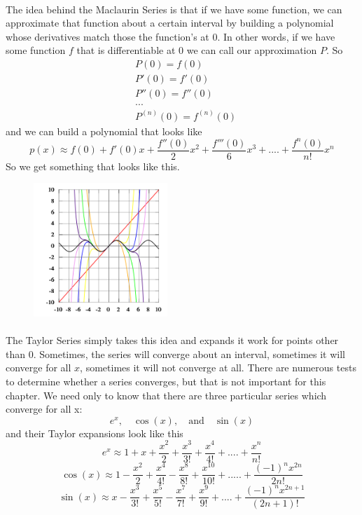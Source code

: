 \documentclass[font =22]{report}
\begin{document}
\paragraph*{}
The idea behind the Maclaurin Series is that if we have some function, we can approximate that function about a certain interval by building a polynomial whose derivatives match those the function's at 0. In other words, if we have some function $f$ that is differentiable at $0$ we can call our approximation $P$. So
\begin{align*}
&P(0) = f(0)\\
&P'(0) = f'(0)\\
&P''(0) = f''(0)\\
&...\\
&P^{(n)}(0) = f^{(n)}(0)
\end{align*}
and we can build a polynomial that looks like
\[
p(x) \approx f(0) + f'(0)x + \frac{f''(0)}{2}x^2 + \frac{f'''(0)}{6}x^3 +....+ \dfrac{f^{n}(0)}{n!}x^n
\]
So we get something that looks like this.
\begin{figure}[H]
\includegraphics[width=0.45\textwidth]{figures/Taylor}
\end{figure}
\paragraph{}
The Taylor Series simply takes this idea and expands it work for points other than $0$.
Sometimes, the series will converge about an interval, sometimes it will converge for all $x$,  sometimes it will not converge at all. There are numerous tests to determine whether a series converges, but that is not important for this chapter. We need only to know that there are three particular series which converge for all x: 
\[
e^x, \quad \cos(x) , \quad  \text{and} \quad \sin(x)
\]
and their Taylor expansions look like this 
\[
e^x \approx 1 + x + \frac{x^2}{2} + \frac{x^3}{3!} +\frac{x^4}{4!}+....+ \frac{x^n}{n!}
\]
\[
\cos(x) \approx 1 - \frac{x^2}{2} + \frac{x^4}{4!} - \frac{x^8}{8!} + \frac{x^{10}}{10!} +.....+\frac{(-1)^{n}x^{2n}}{2n!}
\]
\[
\sin(x) \approx x - \frac{x^3}{3!} + \frac{x^5}{5!} - \frac{x^7}{7!} + \frac{x^9}{9!} +....+ \frac{(-1)^nx^{2n+1}}{(2n+1)!}
\]
\end{document}
